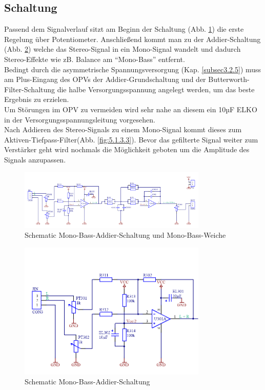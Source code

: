 \subsection{Schaltung}\label{subsec:5.1.3}
Passend dem Signalverlauf sitzt am Beginn der Schaltung (Abb. \ref{fig:5.1.3.1}) die erste Regelung über Potentiometer. Anschließend kommt man zu der Addier-Schaltung (Abb. \ref{fig:5.1.3.2}) welche das Stereo-Signal in ein Mono-Signal wandelt und dadurch Stereo-Effekte wie zB. Balance am \enquote{Mono-Bass} entfernt.\\
Bedingt durch die asymmetrische Spannungsversorgung (Kap. \ref{subsec3.2.5}) muss am Plus-Eingang des OPVs der Addier-Grundschaltung und der Butterworth-Filter-Schaltung die halbe Versorgungsspannung angelegt werden, um das beste Ergebnis zu erzielen.\\
Um Störungen im OPV zu vermeiden wird sehr nahe an diesem ein 10µF ELKO in der Versorgungsspannungsleitung vorgesehen.\\
Nach Addieren des Stereo-Signals zu einem Mono-Signal kommt dieses zum Aktiven-Tiefpass-Filter(Abb. \ref{fig:5.1.3.3}). Bevor das gefilterte Signal weiter zum Verstärker geht wird nochmals die Möglichkeit geboten um die Amplitude des Signals anzupassen.
\begin{figure} [H]
	\centering
	\includegraphics[width=0.8\textwidth]{img/Print3/3mTTWeicheruAddiererDiplSchematic.PNG}
	\caption{Schematic Mono-Bass-Addier-Schaltung und Mono-Bass-Weiche}
	\label {fig:5.1.3.1}
\end{figure}
\begin{figure} [H]
	\centering
	\includegraphics[width=0.8\textwidth]{img/Print3/3mTTWeicheruAddiererDiplSchematicTeil1.png}
	\caption{Schematic Mono-Bass-Addier-Schaltung}
	\label {fig:5.1.3.2}
\end{figure}
